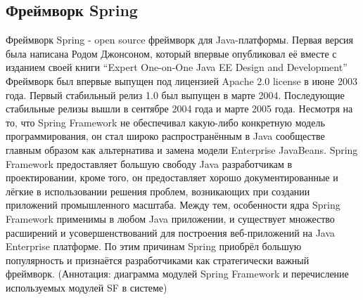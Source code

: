 \documentclass[14pt,a4paper]{reportmod}
\begin{document}
\subsection{Фреймворк Spring}
Фреймворк Spring - open source фреймворк для Java-платформы. Первая версия была написана Родом Джонсоном, который впервые опубликовал её вместе с изданием своей книги ``Expert One-on-One Java EE Design and Development''
Фреймворк был впервые выпущен под лицензией Apache 2.0 license в июне 2003 года. Первый стабильный релиз 1.0 был выпущен в марте 2004. Последующие стабильные релизы вышли в сентябре 2004 года и марте 2005 года.
Несмотря на то, что Spring Framework не обеспечивал какую-либо конкретную модель программирования, он стал широко распространённым в Java сообществе главным образом как альтернатива и замена модели Enterprise JavaBeans. Spring Framework предоставляет большую свободу Java разработчикам в проектировании, кроме того, он предоставляет хорошо документированные и лёгкие в использовании решения проблем, возникающих при создании приложений промышленного масштаба.
Между тем, особенности ядра Spring Framework применимы в любом Java приложении, и существует множество расширений и усовершенствований для построения веб-приложений на Java Enterprise платформе. По этим причинам Spring приобрёл большую популярность и признаётся разработчиками как стратегически важный фреймворк.
(Аннотация: диаграмма модулей Spring Framework и перечисление используемых модулей SF в системе)
\end{document}
